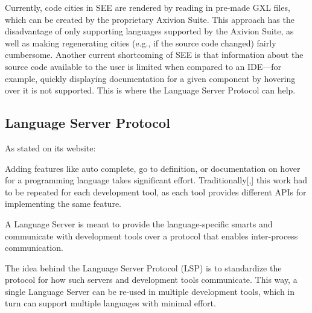 \documentclass{scrartcl}
\newcommand{\SEE}{\textsc{SEE}}
\begin{document}
Currently, code cities in \SEE{} are rendered by reading in pre-made GXL files, which can be created by the proprietary Axivion Suite.
This approach has the disadvantage of only supporting languages supported by the Axivion Suite, as well as making regenerating cities (e.g., if the source code changed) fairly cumbersome.
Another current shortcoming of \SEE{} is that information about the source code available to the user is limited when compared to an IDE---for example, quickly displaying documentation for a given component by hovering over it is not supported.
This is where the Language Server Protocol can help.

\subsection{Language Server Protocol}

As stated on its website:
\begin{displayquote}
  Adding features like auto complete, go to definition, or documentation on hover for a programming language takes significant effort. Traditionally[,] this work had to be repeated for each development tool, as each tool provides different APIs for implementing the same feature.

A Language Server is meant to provide the language-specific smarts and communicate with development tools over a protocol that enables inter-process communication.

The idea behind the Language Server Protocol (LSP) is to standardize the protocol for how such servers and development tools communicate. This way, a single Language Server can be re-used in multiple development tools, which in turn can support multiple languages with minimal effort.
\end{displayquote}
\end{document}
